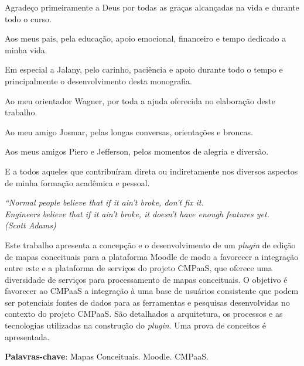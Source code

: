 \documentclass[
	12pt,				%
	openright,			%
	oneside,			%
	a4paper,			%
	english,			%
	french,				%
	spanish,			%
	brazil				%
	]{abntex2}
\begin{document}
\begin{agradecimentos}
	
Agradeço primeiramente a Deus por todas as graças alcançadas na vida e durante todo o curso.

Aos meus pais, pela educação, apoio emocional, financeiro e tempo dedicado a minha vida. 

Em especial a Jalany, pelo carinho, paciência e apoio durante todo o tempo e principalmente o desenvolvimento desta monografia.

Ao meu orientador Wagner, por toda a ajuda oferecida no elaboração deste trabalho.
 
Ao meu amigo Josmar, pelas longas conversas, orientações e broncas.

Aos meus amigos Piero e Jefferson, pelos momentos de alegria e diversão.

E a todos aqueles que contribuíram direta ou indiretamente nos diversos aspectos de
minha formação acadêmica e pessoal.

\end{agradecimentos}

\begin{epigrafe}
     \vspace*{\fill}
 	\begin{flushright}
 		\textit{``Normal people believe that if it ain't broke, don't fix it.\\ Engineers believe that if it ain't broke, it doesn't have enough features yet.\\
 		(Scott Adams)}
 	\end{flushright}
 \end{epigrafe}


\setlength{\absparsep}{18pt} %
\begin{resumo}
Este trabalho  apresenta a concepção e o desenvolvimento de um \textit{plugin} de edição de mapas conceituais para a plataforma Moodle de modo a favorecer a integração  entre este e a plataforma  de serviços do projeto CMPaaS,  que oferece uma diversidade de serviços para processamento  de mapas conceituais. O objetivo é favorecer ao CMPaaS a integração à uma base de usuários consistente que podem ser potenciais fontes de dados para as ferramentas  e pesquisas desenvolvidas no contexto do projeto CMPaaS. São detalhados a arquitetura, os processos e as tecnologias utilizadas na construção do \textit{plugin}. Uma prova de conceitos é apresentada.
	
 \textbf{Palavras-chave}: Mapas Conceituais. Moodle. CMPaaS.
\end{resumo}
\end{document}
